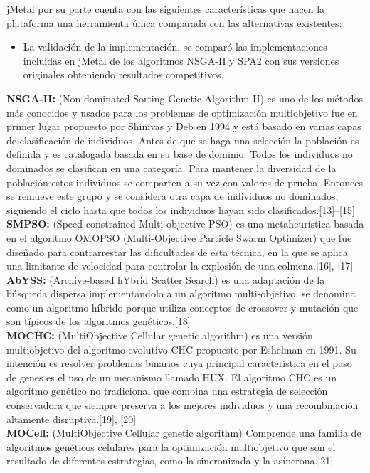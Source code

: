 jMetal por su parte cuenta con las siguientes características que hacen la plataforma una herramienta única comparada con las alternativas existentes:

\begin{itemize}
\item La validación de la implementación, se comparó las implementaciones incluidas en jMetal de los algoritmos NSGA-II y SPA2 con sus versiones originales obteniendo resultados competitivos.\\
\end{itemize}

\textbf{NSGA-II:} (Non-dominated Sorting Genetic Algorithm II) es uno de los métodos más conocidos y usados para los problemas de optimización multiobjetivo fue en primer lugar propuesto por Shinivas y Deb en 1994 y está basado en varias capas de clasificación de individuos. Antes de que se haga una selección la población es definida y es catalogada basada en su base de dominio. Todos los individuos no dominados se clasifican en una categoría. Para mantener la diversidad de la población estos individuos se comparten a su vez con valores de prueba. Entonces se remueve este grupo y se considera otra capa de individuos no dominados, siguiendo el ciclo hasta que todos los individuos hayan sido clasificados.[13]–[15]\\

\textbf{SMPSO:} (Speed constrained Multi-objective PSO) es una metaheurística basada en el algoritmo OMOPSO (Multi-Objective Particle Swarm Optimizer) que fue diseñado para contrarrestar las dificultades de esta técnica, en la que se aplica una limitante de velocidad para controlar la explosión de una colmena.[16], [17]\\

\textbf{AbYSS:} (Archive-based hYbrid Scatter Search) es una adaptación de la búsqueda dispersa implementandolo a un algoritmo multi-objetivo, se denomina como un algoritmo híbrido porque utiliza conceptos de crossover y mutación que son típicos de los algoritmos genéticos.[18]\\

\textbf{MOCHC:} (MultiObjective Cellular genetic algorithm) es una versión multiobjetivo del algoritmo evolutivo CHC propuesto por Eshelman en 1991. Su intención es resolver problemas binarios cuya principal característica en el paso de genes es el uso de un mecanismo llamado HUX. El algoritmo CHC es un algoritmo genético no tradicional que combina una estrategia de selección conservadora que siempre preserva a los mejores individuos y una recombinación altamente disruptiva.[19], [20]\\

\textbf{MOCell:} (MultiObjective Cellular genetic algorithm) Comprende una familia de algoritmos genéticos celulares para la optimización multiobjetivo que son el resultado de diferentes estrategias, como la sincronizada y la asíncrona.[21]\\



